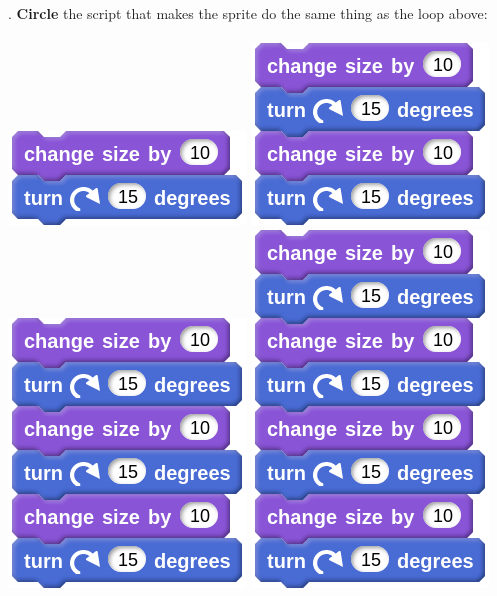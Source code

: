 \documentclass[letterpaper,12pt]{article}
\begin{document}
. \textbf{Circle} the script that makes the sprite do the same thing as the loop above: \\ \\
\includegraphics[scale=.4,valign=t]{q2_script1.png} \hspace{1.25cm}
\includegraphics[scale=.4,valign=t]{q2_script2.png} \hspace{1.25cm}
\includegraphics[scale=.4,valign=t]{q2_script3.png} \hspace{1.25cm}
\includegraphics[scale=.4,valign=t]{q2_script4.png} \hspace{1.25cm} \\
\end{document}
